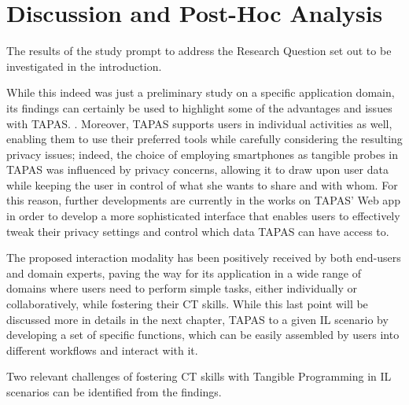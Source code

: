 \section{Discussion and Post-Hoc Analysis}
The results of the study prompt to address the Research Question set out to be investigated in the introduction.

While this indeed was just a preliminary study on a specific application domain, its findings can certainly be used to highlight some of the advantages and issues with \ac{TAPAS}. . Moreover, \ac{TAPAS} supports users in individual activities as well, enabling them to use their preferred tools while carefully considering the resulting privacy issues; indeed, the choice of employing smartphones as tangible probes in \acs{TAPAS} was influenced by privacy concerns, allowing it to draw upon user data while keeping the user in control of what she wants to share and with whom. For this reason, further developments are currently in the works on \acs{TAPAS}' Web app in order to develop a more sophisticated interface that enables users to effectively tweak their privacy settings and control which data \acs{TAPAS} can have access to.

The proposed interaction modality has been positively received by both end-users and domain experts, paving the way for its application in a wide range of domains where users need to perform simple tasks, either individually or collaboratively, while fostering their \ac{CT} skills. While this last point will be discussed more in details in the next chapter, \ac{TAPAS}  to a given \ac{IL} scenario by developing a set of specific functions, which can be easily assembled by users into different workflows and interact with it.

Two relevant challenges of fostering \ac{CT} skills with Tangible Programming in \ac{IL} scenarios can be identified from the findings. 

